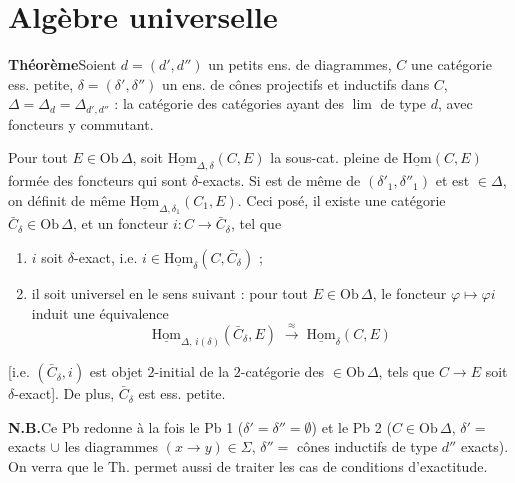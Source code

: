 \documentclass[11pt,a4paper]{article}
\begin{document}
\section*{Algèbre universelle}


\textbf{Théorème}\quad Soient $d = (d', d'')$ un  petits ens. de
diagrammes, $C$ une catégorie ess. petite, $\delta = (\delta', \delta'')$ un
 ens. de cônes projectifs et inductifs dans $C$,
$\Delta = \Delta_{d} = \Delta_{d',d''}$ : la catégorie des catégories ayant des
$\lim$ de type $d$, avec foncteurs y commutant.


Pour tout $E \in \mathrm{Ob}\,\Delta$, soit
$\underline{\mathrm{Hom}}_{\Delta,\delta}(C,E)$ la sous-cat. pleine de
$\underline{\mathrm{Hom}}(C,E)$ formée des foncteurs qui sont $\delta$-exacts.
Si \ill{} est de même de $(\delta'_1, \delta''_1)$ et est $\in \Delta$, on
définit de même $\underline{\mathrm{Hom}}_{\Delta,\delta_1}(C_1,E)$. Ceci posé,
il existe une catégorie $\bar{C}_{\delta} \in \mathrm{Ob}\,\Delta$, et un
foncteur $i : C \to \bar{C}_{\delta}$, tel que

\begin{enumerate}
  \item[a)] $i$ soit $\delta$-exact, i.e.
    $i \in \underline{\mathrm{Hom}}_{\delta}(C, \bar{C}_{\delta})$ ;
  \item[b)] il soit universel en le sens suivant : pour tout
    $E \in \mathrm{Ob}\,\Delta$, le foncteur $\varphi \mapsto \varphi i$ induit
    une équivalence
    \[
      \underline{\mathrm{Hom}}_{\Delta,\, i(\delta)}(\bar{C}_{\delta}, E)
      \;\xrightarrow{\ \approx\ }\;
      \underline{\mathrm{Hom}}_{\delta}(C, E)
    \]
\end{enumerate}

[i.e. $(\bar{C}_{\delta}, i)$ est objet $2$-initial de la $2$-catégorie des
 $\in \mathrm{Ob}\,\Delta$,  tels que $C \to E$ soit
$\delta$-exact]. De plus, $\bar{C}_{\delta}$ est ess. petite.

\textbf{N.B.}\quad Ce Pb redonne à la fois le Pb 1 ($\delta' = \delta'' =
\emptyset$) et le Pb 2 ($C \in \mathrm{Ob}\,\Delta$, \struck{\ill{}}
$\delta' = $   exacts
 $\cup$ les diagrammes $(x \to y) \in \Sigma$,
$\delta'' = $  cônes inductifs de type $d''$ exacts). On verra
que le Th. permet aussi de traiter les cas de conditions d'exactitude.
\end{document}
